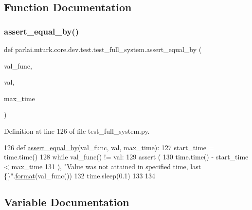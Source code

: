 \subsection{Function Documentation}
\mbox{\label{namespaceparlai_1_1mturk_1_1core_1_1dev_1_1test_1_1test__full__system_a08d3f9d5e50fd752ba609ce51013e4ce}} 
\subsubsection{\texorpdfstring{assert\+\_\+equal\+\_\+by()}{assert\_equal\_by()}}
{\footnotesize\ttfamily def parlai.\+mturk.\+core.\+dev.\+test.\+test\+\_\+full\+\_\+system.\+assert\+\_\+equal\+\_\+by (\begin{DoxyParamCaption}\item[{}]{val\+\_\+func,  }\item[{}]{val,  }\item[{}]{max\+\_\+time }\end{DoxyParamCaption})}



Definition at line 126 of file test\+\_\+full\+\_\+system.\+py.


\begin{DoxyCode}
126 \textcolor{keyword}{def }\hyperlink{namespaceparlai_1_1mturk_1_1core_1_1test_1_1test__full__system_a0b463246d35658a2e422010f13dcf819}{assert\_equal\_by}(val\_func, val, max\_time):
127     start\_time = time.time()
128     \textcolor{keywordflow}{while} val\_func() != val:
129         \textcolor{keyword}{assert} (
130             time.time() - start\_time < max\_time
131         ), \textcolor{stringliteral}{"Value was not attained in specified time, last \{\}"}.\hyperlink{namespaceparlai_1_1chat__service_1_1services_1_1messenger_1_1shared__utils_a32e2e2022b824fbaf80c747160b52a76}{format}(val\_func())
132         time.sleep(0.1)
133 
134 
\end{DoxyCode}


\subsection{Variable Documentation}
\mbox{\label{namespaceparlai_1_1mturk_1_1core_1_1dev_1_1test_1_1test__full__system_a64887c1d71a85594217bdf489c62a085}} 
